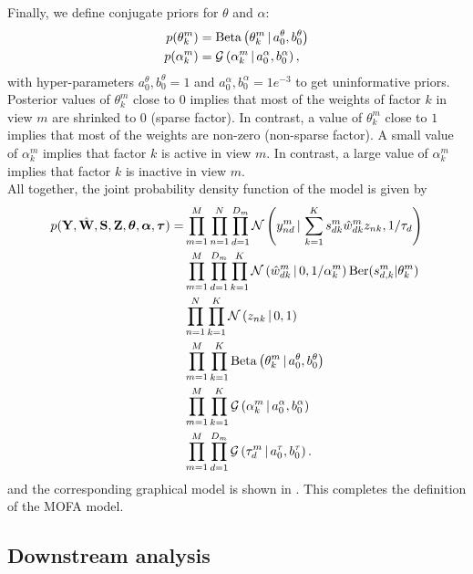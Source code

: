 Finally, we define conjugate priors for $\theta$ and $\alpha$:
\begin{align}
	p(\theta_k^m) &= \text{Beta}\left(\theta_k^m \,|\, a_0^\theta,b_0^\theta\right)\\
	p(\alpha_k^m) &= \mathcal{G}\left(\alpha_k^m \,|\, a_0^\alpha, b_0^\alpha\right),
\end{align}
with hyper-parameters $a_0^\theta,b_0^\theta =1$ and $a_0^\alpha, b_0^\alpha=1e^{-3}$ to get uninformative priors.\\
Posterior values of $\theta_k^m$ close to $0$ implies that most of the weights of factor $k$ in view $m$ are shrinked to $0$ (sparse factor). In contrast, a value of $\theta_k^m$ close to $1$ implies that most of the weights are non-zero (non-sparse factor). A small value of $\alpha_k^m$ implies that factor $k$ is active in view $m$. In contrast, a large value of $\alpha_k^m$ implies that factor $k$ is inactive in view $m$.\\

All together, the joint probability density function of the model is given by
\begin{align}
	\begin{split}
	p({\bf Y},\hat{{\bf W}},{\bf S},{\bf Z},\mbox{\boldmath $\theta$}, \mbox{\boldmath $\alpha$}, \mbox{\boldmath $\tau$})  = &\prod_{m=1}^{M} \prod_{n=1}^{N} \prod_{d=1}^{D_m} \mathcal{N}\left(y_{nd}^m \,|\, \sum_{k=1}^{K} s_{dk}^m \hat{w}_{dk}^m z_{nk},1/\tau_d\right) \\
	& \prod_{m=1}^{M}\prod_{d=1}^{D_m} \prod_{k=1}^{K} \mathcal{N}\left(\hat{w}_{dk}^m \,|\, 0,1/\alpha_k^m\right) \text{Ber}(s_{d,k}^m|\theta_k^m) \\
	& \prod_{n=1}^{N} \prod_{k=1}^{K} \mathcal{N}\left(z_{nk} \,|\, 0,1\right) \\
	& \prod_{m=1}^{M} \prod_{k=1}^{K} \text{Beta}\left(\theta_k^m \,|\, a_0^\theta,b_0^\theta\right)\\
	& \prod_{m=1}^{M} \prod_{k=1}^{K} \mathcal{G}\left(\alpha_k^m \,|\, a_0^\alpha, b_0^\alpha\right)\\
	& \prod_{m=1}^{M} \prod_{d=1}^{D_m} \mathcal{G}\left(\tau_d^m \,|\, a_0^\tau,b_0^\tau\right).
	\label{likelihood}
	\end{split}
\end{align}
and the corresponding graphical model is shown in . This completes the definition of the MOFA model.

\subsection{Downstream analysis}

